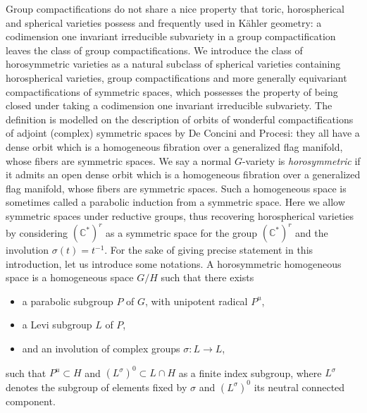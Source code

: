 \documentclass{amsart}
\theoremstyle{definition}
\begin{document}
Group compactifications do not share a nice property that toric, horospherical 
and spherical varieties possess and frequently used in Kähler geometry: 
a codimension one invariant irreducible 
subvariety in a group compactification leaves the class of group compactifications.
We introduce the class of horosymmetric varieties as a natural subclass of spherical 
varieties containing horospherical varieties, group compactifications and more 
generally equivariant compactifications of symmetric spaces, which possesses the 
property of being closed under taking a codimension one invariant irreducible 
subvariety. 
The definition is modelled on the description of orbits of wonderful compactifications 
of adjoint (complex) symmetric spaces by De Concini and Procesi: they all have a dense orbit 
which is a homogeneous fibration over a generalized flag manifold, whose fibers 
are symmetric spaces. 
We say a normal $G$-variety is \emph{horosymmetric} if it admits an open dense orbit 
which is a homogeneous fibration over a generalized flag manifold, whose fibers 
are symmetric spaces. 
Such a homogeneous space is sometimes called a parabolic induction 
from a symmetric space.
Here we allow symmetric spaces under reductive groups, thus 
recovering horospherical varieties by considering $(\mathbb{C}^*)^r$ as 
a symmetric space for the group $(\mathbb{C}^*)^r$ and the involution 
$\sigma(t)=t^{-1}$. 
For the sake of giving precise statement in this introduction, let us introduce some 
notations. A horosymmetric homogeneous space is a homogeneous space $G/H$ such that 
there exists 
\begin{itemize}
\item a parabolic subgroup $P$ of $G$, with unipotent radical $P^u$, 
\item a Levi subgroup $L$ of $P$,
\item and an involution of complex groups $\sigma:L\rightarrow L$, 
\end{itemize}
such that $P^u\subset H$ and $(L^{\sigma})^0\subset L\cap H$ as a finite index subgroup, 
where $L^{\sigma}$ denotes the subgroup of elements fixed by $\sigma$ 
and $(L^{\sigma})^0$ its neutral connected component. 
\end{document}
